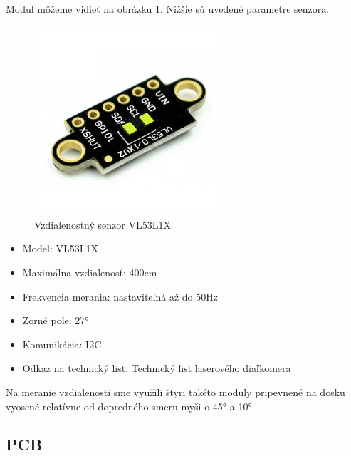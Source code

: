 Modul môžeme vidieť na obrázku  \ref{fig:vl53l1x}. Nižšie sú uvedené parametre senzora.
\begin{figure}[!htpb]
	\centering
	\includegraphics[width=7cm]{includes/images/vl53l1x.jpg}
	\caption{Vzdialenostný senzor VL53L1X}
	\label{fig:vl53l1x}
\end{figure}
\begin{itemize}

	\item Model: VL53L1X

	\item Maximálna vzdialenosť: 400cm

	\item Frekvencia merania: nastaviteľná až do 50Hz

	\item Zorné pole: 27°

	\item Komunikácia: I2C

	\item Odkaz na technický list: \href{https://www.st.com/resource/en/datasheet/vl53l1x.pdf}{Technický list laserového diaľkomera}

\end{itemize}



Na meranie vzdialenosti sme využili štyri takéto moduly pripevnené na dosku vyosené relatívne od dopredného smeru myši o 45° a 10°.

\subsection{PCB}
